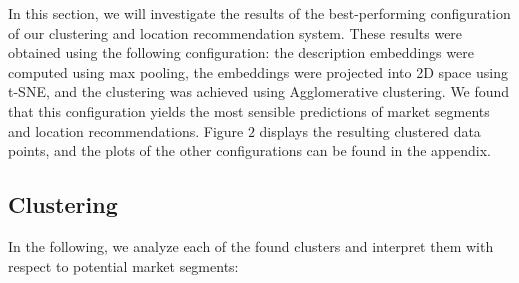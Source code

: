 \documentclass[conference]{IEEEtran}
\begin{document}
In this section, we will investigate the results of the best-performing configuration of our clustering and location recommendation system. These results were obtained using the following configuration: the description embeddings were computed using max pooling, the embeddings were projected into 2D space using t-SNE, and the clustering was achieved using Agglomerative clustering. We found that this configuration yields the most sensible predictions of market segments and location recommendations. Figure \hyperref[fig:t-sne-agglomerative]{$2$} displays the resulting clustered data points, and the plots of the other configurations can be found in the appendix.

\subsection{Clustering}
In the following, we analyze each of the found clusters and interpret them with respect to potential market segments:
\end{document}
